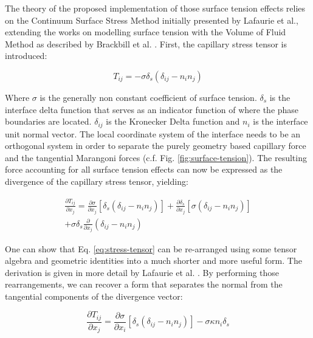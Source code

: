 \documentclass[conference,final]{IEEEtran}
\begin{document}
The theory of the proposed implementation of those surface tension effects relies on the Continuum Surface Stress Method initially presented by Lafaurie et al., extending the works on modelling surface tension with the Volume of Fluid Method as described by Brackbill et al. \cite{lafaurieModellingMergingFragmentation1994,brackbillContinuumMethodModeling1992}.
 First, the capillary stress tensor is introduced:

\begin{equation}
    T_{ij} = - \sigma \delta_s (\delta_{ij} - n_i n_j)
\end{equation}

Where $\sigma$ is the generally non constant coefficient of surface tension. $\delta_s$ is the interface delta function that serves as an indicator function of where the phase boundaries are located. $\delta_{ij}$ is the Kronecker Delta function and $n_i$ is the interface unit normal vector. The local coordinate system of the interface needs to be an orthogonal system in order to separate the purely geometry based capillary force and the tangential Marangoni forces (c.f. Fig. \ref{fig:surface-tension}).
The resulting force accounting for all surface tension effects can now be expressed as the divergence of the capillary stress tensor, yielding:

\begin{multline} \label{eq:stress-tensor}
    \frac{\partial T_{ij}}{\partial x_j} = \frac{\partial \sigma}{\partial x_j} [\delta_s(\delta_{ij} - n_i n_j)] + \frac{\partial \delta_s}{\partial x_j} [\sigma (\delta_{ij} - n_i n_j)] \\ + \sigma \delta_s \frac{\partial}{\partial x_j} (\delta_{ij} - n_i n_j)
\end{multline}

One can show that Eq. \ref{eq:stress-tensor} can be re-arranged using some tensor algebra and geometric identities into a much shorter and more useful form. The derivation is given in more detail by Lafaurie et al. \cite{lafaurieModellingMergingFragmentation1994}. By performing those rearrangements, we can recover a form that separates the normal from the tangential components of the divergence vector:

\begin{equation}
\label{eq:divergence-capillarystress}
    \frac{\partial T_{ij}}{\partial x_j} = \frac{\partial \sigma}{\partial x_i} [\delta_s(\delta_{ij} - n_i n_j)] - \sigma \kappa n_i \delta_s 
\end{equation}
\end{document}
